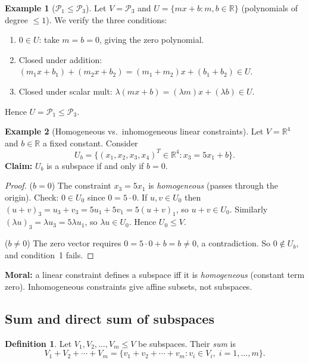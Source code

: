 \documentclass[11pt]{article}
\theoremstyle{definition}
\newtheorem{definition}{Definition}[section]
\newtheorem{example}{Example}[section]
\theoremstyle{plain}
\begin{document}
\begin{example}[$\mathcal{P}_1 \le \mathcal{P}_3$]
  Let $V = \mathcal{P}_3$ and $U = \{mx + b : m,b\in\mathbb{R}\}$
  (polynomials of degree $\le 1$).  We verify the three conditions:
  \begin{enumerate}
    \item $0\in U$: take $m=b=0$, giving the zero polynomial. \checkmark
    \item Closed under addition: $(m_1 x+b_1)+(m_2 x+b_2) = (m_1+m_2)x+(b_1+b_2)\in U$. \checkmark
    \item Closed under scalar mult: $\lambda(mx+b) = (\lambda m)x+(\lambda b)\in U$. \checkmark
  \end{enumerate}
  Hence $U = \mathcal{P}_1 \le \mathcal{P}_3$.
\end{example}

\begin{example}[Homogeneous vs.\ inhomogeneous linear constraints]
  Let $V = \mathbb{R}^4$ and $b\in\mathbb{R}$ a fixed constant.  Consider
  \[
    U_b = \{(x_1,x_2,x_3,x_4)^T\in\mathbb{R}^4 : x_3 = 5x_1 + b\}.
  \]
  \textbf{Claim:} $U_b$ is a subspace if and only if $b = 0$.
  \begin{proof}
    ($b=0$) The constraint $x_3 = 5x_1$ is \emph{homogeneous} (passes
    through the origin).  Check: $0\in U_0$ since $0=5\cdot 0$.  If
    $u,v\in U_0$ then $(u+v)_3 = u_3+v_3 = 5u_1+5v_1 = 5(u+v)_1$, so
    $u+v\in U_0$.  Similarly $(\lambda u)_3 = \lambda u_3 = 5\lambda u_1$,
    so $\lambda u\in U_0$.  Hence $U_0\le V$.

    ($b\ne 0$) The zero vector requires $0 = 5\cdot 0 + b = b \ne 0$,
    a contradiction.  So $0\notin U_b$, and condition~1 fails.
  \end{proof}
  \textbf{Moral:} a linear constraint defines a subspace iff it is
  \emph{homogeneous} (constant term zero).  Inhomogeneous constraints give
  affine subsets, not subspaces.
\end{example}

\subsection{Sum and direct sum of subspaces}

\begin{definition}
  Let $V_1, V_2, \ldots, V_m \le V$ be subspaces.  Their \emph{sum} is
  \[
    V_1 + V_2 + \cdots + V_m
    = \{v_1 + v_2 + \cdots + v_m : v_i\in V_i,\; i=1,\ldots,m\}.
  \]
\end{definition}
\end{document}
